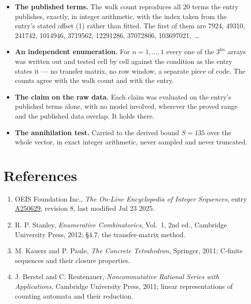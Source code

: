 \documentclass[11pt]{article}
\theoremstyle{definition}
\begin{document}
\begin{itemize}

\item {\bfseries The published terms.} The walk count reproduces all 20 terms the entry publishes, exactly, in integer arithmetic, with the index taken from the entry's stated offset (1) rather than fitted. The first of them are 7924, 49310, 241742, 1014946, 3719562, 12291286, 37072806, 103697021,~\dots

\item {\bfseries An independent enumeration.} For $n = 1,\dots,1$ every one of the $3^{6n}$ arrays was written out and tested cell by cell against the condition as the entry states it --- no transfer matrix, no row window, a separate piece of code. The counts agree with the walk count and with the entry.

\item {\bfseries The claim on the raw data.} Each claim was evaluated on the entry's published terms alone, with no model involved, wherever the proved range and the published data overlap. It holds there.

\item {\bfseries The annihilation test.} Carried to the derived bound $S = 135$ over the whole vector, in exact integer arithmetic, never sampled and never truncated.

\end{itemize}

\section{References}

\begin{enumerate}

\item OEIS Foundation Inc., \emph{The On-Line Encyclopedia of Integer Sequences}, entry \href{https://oeis.org/A250629}{A250629}, revision 8, last modified Jul 23 2025.

\item R. P. Stanley, \emph{Enumerative Combinatorics}, Vol.~1, 2nd ed., Cambridge University Press, 2012; \S4.7, the transfer-matrix method.

\item M. Kauers and P. Paule, \emph{The Concrete Tetrahedron}, Springer, 2011; C-finite sequences and their closure properties.

\item J. Berstel and C. Reutenauer, \emph{Noncommutative Rational Series with Applications}, Cambridge University Press, 2011; linear representations of counting automata and their reduction.

\end{enumerate}
\end{document}
